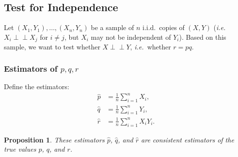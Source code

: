 \documentclass[letterpaper, oneside, reqno]{amsart}
\newtheorem{prop}{Proposition}[section]
\numberwithin{equation}{section}
\newcommand{\ie}{\emph{i.e.\ }}
\newcommand{\indep}{\perp \!\!\! \perp}  %
\newcommand{\iid}{i.i.d.}
\newcommand{\sumi}[2]{\sum_{#1=1}^{#2}}
\newcommand{\avg}[2]{\frac{1}{#2}\sumi{#1}{#2}}
\newcommand{\phat}{\hat{p}}
\newcommand{\qhat}{\hat{q}}
\newcommand{\rhat}{\hat{r}}
\begin{document}
\subsection{Test for Independence}
Let $(X_1, Y_1), \dots, (X_n, Y_n)$ be a sample of $n$ \iid\ copies of $(X, Y)$
(\ie $X_i \indep X_j$ for $i \ne j$, but $X_i$ may not be independent of $Y_i$).
Based on this sample, we want to test whether $X \indep Y$, \ie whether $r = pq$.

\subsubsection{Estimators of $p, q, r$}
Define the estimators:
\begin{align*}
  \phat &= \avg{i}{n} X_i, \\
  \qhat &= \avg{i}{n} Y_i, \\
  \rhat &= \avg{i}{n} X_i Y_i.
\end{align*}

\begin{prop}
  These estimators $\phat$, $\qhat$, and $\rhat$ are consistent estimators of
  the true values $p$, $q$, and $r$.
\end{prop}
\end{document}
